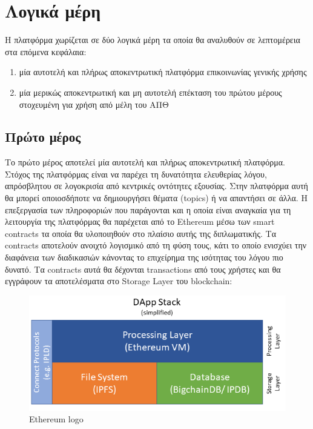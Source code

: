 \section{Λογικά μέρη} \label{section:3-1-logical-parts}


Η πλατφόρμα χωρίζεται σε δύο λογικά μέρη τα οποία θα αναλυθούν σε λεπτομέρεια στα επόμενα κεφάλαια:

\begin{enumerate}
    \item μία αυτοτελή και πλήρως αποκεντρωτική πλατφόρμα επικοινωνίας γενικής χρήσης
    \item μία μερικώς αποκεντρωτική και μη αυτοτελή επέκταση του πρώτου μέρους στοχευμένη για χρήση από μέλη του ΑΠΘ
\end{enumerate}

\subsection{Πρώτο μέρος} \label{subsection:3-1-first-part}

Το πρώτο μέρος αποτελεί μία αυτοτελή και πλήρως αποκεντρωτική πλατφόρμα. Στόχος της πλατφόρμας είναι να παρέχει τη
δυνατότητα ελευθερίας λόγου, απρόσβλητου σε λογοκρισία από κεντρικές οντότητες εξουσίας. Στην πλατφόρμα αυτή θα μπορεί
οποιοσδήποτε να δημιουργήσει θέματα (topics) ή να απαντήσει σε άλλα. Η επεξεργασία των πληροφοριών που παράγονται και η
οποία είναι αναγκαία για τη λειτουργία της πλατφόρμας θα παρέχεται από το Ethereum μέσω των smart contracts τα οποία θα
υλοποιηθούν στο πλαίσιο αυτής της διπλωματικής. Τα contracts αποτελούν ανοιχτό λογισμικό από τη φύση τους, κάτι το οποίο
ενισχύει την διαφάνεια των διαδικασιών κάνοντας το επιχείρημα της ισότητας του λόγου πιο δυνατό. Τα contracts αυτά θα
δέχονται transactions από τους χρήστες και θα εγγράφουν τα αποτελέσματα στο Storage Layer του blockchain:

\begin{figure}[H]
    \centering
    \includegraphics[width=.75\textwidth]{assets/figures/chapter-3/simple_dapp_stack}
    \caption{Ethereum logo}
\end{figure}

